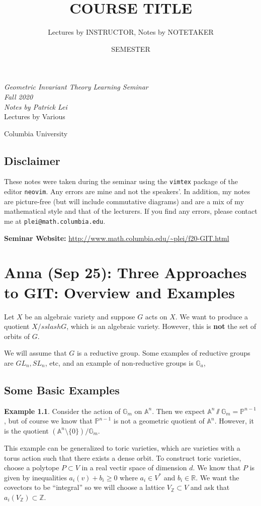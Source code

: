 \documentclass[leqno, openany]{memoir}
\title{COURSE TITLE}
\author{Lectures by INSTRUCTOR, Notes by NOTETAKER}
\date{SEMESTER}
\theoremstyle{definition}
\newtheorem{exm}[thm]{Example}
\theoremstyle{remark}
\theoremstyle{plain}
\theoremstyle{definition}
\theoremstyle{remark}
\newcommand{\A}{\mathbb{A}}
\newcommand{\R}{\mathbb{R}}
\newcommand{\Z}{\mathbb{Z}}
\renewcommand{\P}{\mathbb{P}}
\newcommand*{\titleSW}
    {\begingroup%
    \raggedleft
    \vspace*{\baselineskip}
    {\Huge\itshape Geometric Invariant Theory Learning Seminar \\ Fall 2020}\\[\baselineskip]
    {\large\itshape Notes by Patrick Lei}\\[0.2\textheight]
    {\Large Lectures by Various}\par
    \vfill
    {\Large \sffamily Columbia University}
    \vspace*{\baselineskip}
\endgroup}
\begin{document}
    
\begin{titlingpage}
\titleSW
\end{titlingpage}

\thispagestyle{empty}
\section*{Disclaimer}%
\label{sec:disclaimer}

These notes were taken during the seminar using the \texttt{vimtex} package of the editor \texttt{neovim}. 
Any errors are mine and not the speakers'. 
In addition, my notes are picture-free (but will include commutative diagrams) and are a mix of my mathematical style and that of the lecturers.
If you find any errors, please contact me at \texttt{plei@math.columbia.edu}.

\vspace*{1cm}

\noindent\textbf{Seminar Website:}  \url{http://www.math.columbia.edu/~plei/f20-GIT.html}
\newpage


\tableofcontents

\chapter{Anna (Sep 25): Three Approaches to GIT: Overview and Examples}%
\label{cha:sep_25_anna_}

Let $X$ be an algebraic variety and suppose $G$ acts on $X$. We want to produce a quotient $X /sslash G$, which is an algebraic variety. However, this is \textbf{not} the set of orbits of $G$.

We will assume that $G$ is a reductive group. Some examples of reductive groups are $GL_n, SL_n$, etc, and an example of non-reductive groups is $\mathbb{G}_a$,

\section{Some Basic Examples}%
\label{sec:some_basic_examples}

\begin{exm}
    Consider the action of $\mathbb{G}_m$ on $\A^n$. Then we expect $\A^n \sslash \mathbb{G}_m = \P^{n-1}$, but of course we know that $\P^{n-1}$ is not a geometric quotient of $\A^n$. However, it is the quotient $(\A^n \setminus \{0 \}) / \mathbb{G}_m$.
\end{exm}

This example can be generalized to toric varieties, which are varieties with a torus action such that there exists a dense orbit. To construct toric varieties, choose a polytope $P \subset V$ in a real vectir space of dimension $d$. We know that $P$ is given by inequalities $a_i(v) + b_i \geq 0$ where $a_i \in V^*$ and $b_i \in \R$. We want the covectors to be ``integral'' so we will choose a lattice $V_{\Z} \subset V$ and ask that $a_i(V_{\Z}) \subset\Z$.
\end{document}
